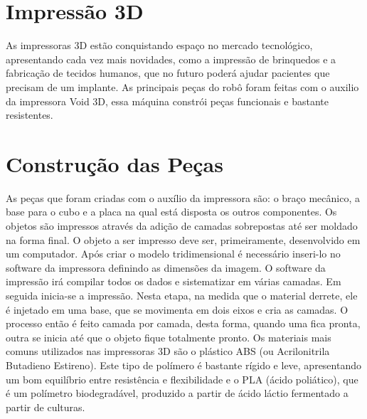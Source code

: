  
\section{Impressão 3D}

    As impressoras 3D estão conquistando espaço no mercado tecnológico, apresentando cada vez mais novidades, como a impressão de brinquedos e a fabricação de tecidos humanos, que no futuro poderá ajudar pacientes que precisam de um implante. As principais peças do robô foram feitas com o auxilio da impressora Void 3D, essa máquina constrói peças funcionais e bastante resistentes.
    
\section{Construção das Peças}


As peças que foram criadas com o auxílio da impressora são: o braço mecânico, a base para o cubo e a placa na qual está disposta os outros componentes.
Os objetos são impressos através da adição de camadas sobrepostas até ser moldado na forma final. O objeto a ser impresso deve ser, primeiramente, desenvolvido em um computador. Após criar o modelo tridimensional é necessário inseri-lo no software da impressora definindo as dimensões da imagem. O software da impressão irá compilar todos os dados e sistematizar em várias camadas. Em seguida inicia-se a impressão. Nesta etapa, na medida que o material derrete, ele é injetado em uma base, que se movimenta em dois eixos e cria as camadas. O processo então é feito camada por camada, desta forma, quando uma fica pronta, outra se inicia até que o objeto fique totalmente pronto. Os materiais mais comuns utilizados nas impressoras 3D são o plástico ABS (ou Acrilonitrila Butadieno Estireno). Este tipo de polímero é bastante rígido e leve, apresentando um bom equilíbrio entre resistência e flexibilidade e o PLA (ácido poliático), que é um polímetro biodegradável, produzido a partir de ácido láctio fermentado a partir de culturas.\cite{impressora}





